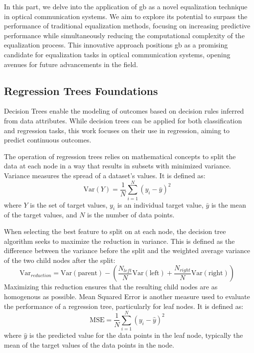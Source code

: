 In this part, we delve into the application of
\acrshort{gb}
as a novel equalization technique in optical communication systems. We aim to explore its potential to surpass the performance of traditional equalization methods, focusing on increasing predictive performance while simultaneously reducing the computational complexity of the equalization process. This innovative approach positions \acrlong{gb} as a promising candidate for equalization tasks in optical communication systems, opening avenues for future advancements in the field.

\subsection{Regression Trees Foundations}
Decision Trees enable the modeling of outcomes based on decision rules inferred from data attributes. While decision trees can be applied for both classification and regression tasks, this work focuses on their use in regression, aiming to predict continuous outcomes.

The operation of regression trees relies on mathematical concepts to split the data at each node in a way that results in subsets with minimized variance. 
Variance measures the spread of a dataset's values. It is defined as:
\begin{equation}
    \mathrm{Var}(Y) = \frac{1}{N} \sum_{i=1}^{N} (y_i - \bar{y})^2
\end{equation}
where $Y$ is the set of target values, $y_i$ is an individual target value, $\bar{y}$ is the mean of the target values, and $N$ is the number of data points.

When selecting the best feature to split on at each node, the decision tree algorithm seeks to maximize the reduction in variance. This is defined as the difference between the variance before the split and the weighted average variance of the two child nodes after the split:
\begin{equation}
    \mathrm{Var}_{reduction} = \mathrm{Var}(\mathrm{parent}) - \left( \frac{N_{left}}{N} \mathrm{Var}(\mathrm{left}) + \frac{N_{right}}{N} \mathrm{Var}(\mathrm{right}) \right)
\end{equation}
Maximizing this reduction ensures that the resulting child nodes are as homogenous as possible.
Mean Squared Error is another measure used to evaluate the performance of a regression tree, particularly for leaf nodes. It is defined as:
\begin{equation}
    \mathrm{MSE} = \frac{1}{N} \sum_{i=1}^{N} (y_i - \hat{y})^2
\end{equation}
where $\hat{y}$ is the predicted value for the data points in the leaf node, typically the mean of the target values of the data points in the node.


